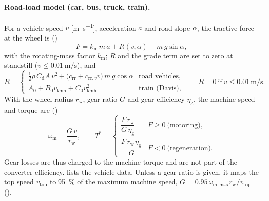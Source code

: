 \paragraph{Road-load model (car, bus, truck, train).} For a vehicle speed $v$ [\si{\metre\per\second}], acceleration $a$ and road slope $\alpha$, the tractive force at the wheel is ()
\begin{equation}
F=k_\mathrm{m}\,m\,a+R(v,\alpha)+m\,g\sin\alpha,
\label{eq:roadload}
\end{equation}
with the rotating-mass factor $k_\mathrm{m}$; $R$ and the grade term are set to zero at standstill ($v\le\SI{0.01}{\metre\per\second}$), and
\begin{equation}
R=\begin{cases}\tfrac12\rho\,C_\mathrm{d}A\,v^2+\big(c_\mathrm{rr}+c_{\mathrm{rr},v}v\big)\,m\,g\cos\alpha & \text{road vehicles},\\[2pt] A_0+B_0v_\mathrm{kmh}+C_0v_\mathrm{kmh}^2 & \text{train (Davis)},\end{cases}\qquad R=0\ \text{if}\ v\le\SI{0.01}{\metre\per\second}.
\label{eq:resistance}
\end{equation}
With the wheel radius $r_\mathrm{w}$, gear ratio $G$ and gear efficiency $\eta_\mathrm{g}$, the machine speed and torque are ()
\begin{equation}
\omega_\mathrm{m}=\frac{G\,v}{r_\mathrm{w}},\qquad
T^*=\begin{cases}\dfrac{F\,r_\mathrm{w}}{G\,\eta_\mathrm{g}} & F\ge0\ \text{(motoring)},\\[6pt] \dfrac{F\,r_\mathrm{w}\,\eta_\mathrm{g}}{G} & F<0\ \text{(regeneration)}.\end{cases}
\label{eq:wheel2machine}
\end{equation}
Gear losses are thus charged to the machine torque and are not part of the converter efficiency.  lists the vehicle data. Unless a gear ratio is given, it maps the top speed $v_\mathrm{top}$ to \SI{95}{\percent} of the maximum machine speed, $G=0.95\,\omega_\mathrm{m,max}r_\mathrm{w}/v_\mathrm{top}$ ().

